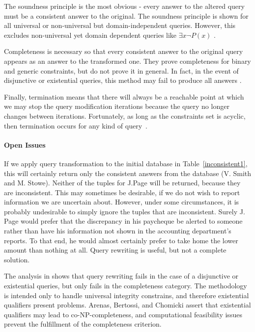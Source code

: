 The soundness principle is the most obvious - every answer to the altered query must be a consistent answer to the original. The soundness principle is shown for all universal or non-universal but domain-independent queries. However, this excludes non-universal yet domain dependent queries like $\exists x \neg P(x)$ \cite{CQI}.

Completeness is necessary so that every consistent answer to the original query appears as an answer to the transformed one. They prove completeness for binary and generic constraints, but do not prove it in general. In fact, in the event of disjunctive or existential queries, this method may fail to produce all answers \cite{CQ}. 

Finally, termination means that there will always be a reachable point at which we may stop the query modification iterations because the query no longer changes between iterations. Fortunately, as long as the constraints set is acyclic, then termination occurs for any kind of  query~\cite{CQI}\cite{CQ}.

\paragraph{Open Issues}
If we apply query transformation to the initial database in Table~\ref{inconsistent1}, this will certainly return only the consistent answers from the database (V. Smith and M. Stowe). Neither of the tuples for J.Page will be returned, because they are inconsistent. This may sometimes be desirable, if we do not wish to report information we are uncertain about. However, under some circumstances, it is probably undesirable to simply ignore the tuples that are inconsistent. Surely J. Page would prefer that the discrepancy in his paycheque be alerted to someone rather than have his information not shown in the accounting department's reports. To that end, he would almost certainly prefer to take home the lower amount than nothing at all. Query rewriting is useful, but not a complete solution.

The analysis in \cite{CQI} shows that query rewriting fails in the case of a disjunctive or existential queries, but only fails in the completeness category. The methodology is intended only to handle universal integrity constrains, and therefore existential qualifiers present problems. Arenas, Bertossi, and Chomicki assert that existential qualifiers may lead to co-NP-completeness, and computational feasibility issues prevent the fulfillment of the completeness criterion. 





